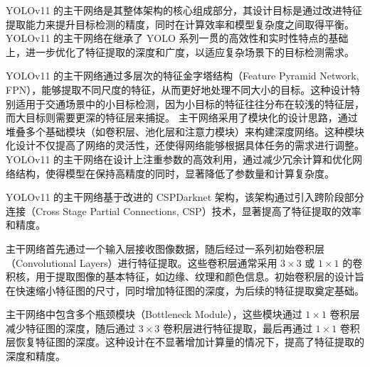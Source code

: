 YOLOv11 的主干网络是其整体架构的核心组成部分，其设计目标是通过改进特征提取能力来提升目标检测的精度，同时在计算效率和模型复杂度之间取得平衡。YOLOv11 的主干网络在继承了 YOLO 系列一贯的高效性和实时性特点的基础上，进一步优化了特征提取的深度和广度，以适应复杂场景下的目标检测需求。

YOLOv11 的主干网络通过多层次的特征金字塔结构（Feature Pyramid Network, FPN），能够提取不同尺度的特征，从而更好地处理不同大小的目标。这种设计特别适用于交通场景中的小目标检测，因为小目标的特征往往分布在较浅的特征层，而大目标则需要更深的特征层来捕捉。
主干网络采用了模块化的设计思路，通过堆叠多个基础模块（如卷积层、池化层和注意力模块）来构建深度网络。这种模块化设计不仅提高了网络的灵活性，还使得网络能够根据具体任务的需求进行调整。
YOLOv11 的主干网络在设计上注重参数的高效利用，通过减少冗余计算和优化网络结构，使得模型在保持高精度的同时，显著降低了参数量和计算复杂度。

YOLOv11 的主干网络基于改进的 CSPDarknet 架构，该架构通过引入跨阶段部分连接（Cross Stage Partial Connections, CSP）技术，显著提高了特征提取的效率和精度。

主干网络首先通过一个输入层接收图像数据，随后经过一系列初始卷积层（Convolutional Layers）进行特征提取。这些卷积层通常采用 $3\times3$ 或 $1\times1$ 的卷积核，用于提取图像的基本特征，如边缘、纹理和颜色信息。初始卷积层的设计旨在快速缩小特征图的尺寸，同时增加特征图的深度，为后续的特征提取奠定基础。
\begin{figure}[htb]
    \centering
    \captionsetup{font=footnotesize}
    \label{fig:YOLOv11_BackBone_input}
\end{figure}

主干网络中包含多个瓶颈模块（Bottleneck Module），这些模块通过 $1\times1$ 卷积层减少特征图的深度，随后通过 $3\times3$ 卷积层进行特征提取，最后再通过 $1\times1$ 卷积层恢复特征图的深度。这种设计在不显著增加计算量的情况下，提高了特征提取的深度和精度。
\begin{figure}[htb]
    \centering
    \captionsetup{font=footnotesize}
    \label{fig:bottleneck}
\end{figure}

